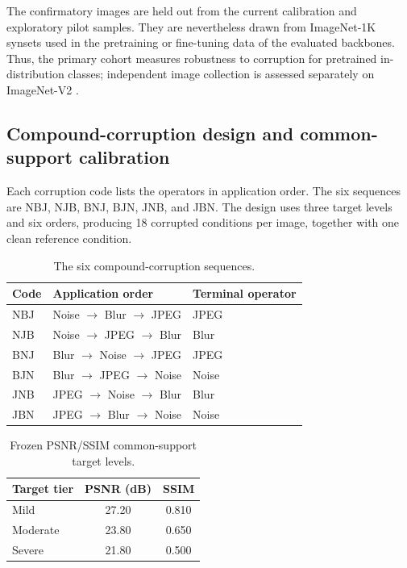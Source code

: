 \documentclass[10pt,twocolumn]{article}
\newcommand{\tighttable}{\setlength{\tabcolsep}{4pt}\renewcommand{\arraystretch}{1.12}}
\begin{document}
The confirmatory images are held out from the current calibration and exploratory pilot samples. They are nevertheless drawn from ImageNet-1K synsets used in the pretraining or fine-tuning data of the evaluated backbones. Thus, the primary cohort measures robustness to corruption for pretrained in-distribution classes; independent image collection is assessed separately on ImageNet-V2 \cite{recht2019}.

\subsection{Compound-corruption design and common-support calibration}

Each corruption code lists the operators in application order. The six sequences are NBJ, NJB, BNJ, BJN, JNB, and JBN. The design uses three target levels and six orders, producing 18 corrupted conditions per image, together with one clean reference condition.

\begin{table}[t]
\centering
\caption{The six compound-corruption sequences.}
\scriptsize\tighttable
\begin{tabular}{lll}
\toprule
Code & Application order & Terminal operator\\
\midrule
NBJ & Noise $\rightarrow$ Blur $\rightarrow$ JPEG & JPEG\\
NJB & Noise $\rightarrow$ JPEG $\rightarrow$ Blur & Blur\\
BNJ & Blur $\rightarrow$ Noise $\rightarrow$ JPEG & JPEG\\
BJN & Blur $\rightarrow$ JPEG $\rightarrow$ Noise & Noise\\
JNB & JPEG $\rightarrow$ Noise $\rightarrow$ Blur & Blur\\
JBN & JPEG $\rightarrow$ Blur $\rightarrow$ Noise & Noise\\
\bottomrule
\end{tabular}
\end{table}

\begin{table}[t]
\centering
\caption{Frozen PSNR/SSIM common-support target levels.}
\small\tighttable
\begin{tabular}{lcc}
\toprule
Target tier & PSNR (dB) & SSIM\\
\midrule
Mild & 27.20 & 0.810\\
Moderate & 23.80 & 0.650\\
Severe & 21.80 & 0.500\\
\bottomrule
\end{tabular}
\end{table}
\end{document}
